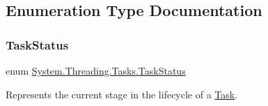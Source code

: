 \subsection{Enumeration Type Documentation}
\mbox{\label{namespace_system_1_1_threading_1_1_tasks_a60ab70a6c84627853d6b1056f1edebcf}} 
\subsubsection{\texorpdfstring{Task\+Status}{TaskStatus}}
{\footnotesize\ttfamily enum \hyperlink{namespace_system_1_1_threading_1_1_tasks_a60ab70a6c84627853d6b1056f1edebcf}{System.\+Threading.\+Tasks.\+Task\+Status}\hspace{0.3cm}{\ttfamily [strong]}}



Represents the current stage in the lifecycle of a \hyperlink{class_system_1_1_threading_1_1_tasks_1_1_task}{Task}. 

